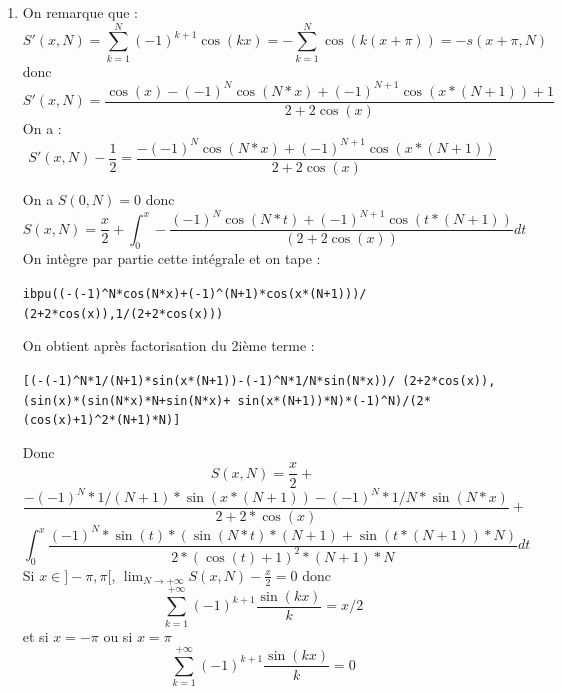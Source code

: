 \documentclass[a4paper,11pt]{book}
\begin{document}
\begin{enumerate}
{\bf Autre m\'ethode}\\
On peut aussi simplifier : $2*\sin(x/2)*s(x,N)$.\\
On tape :\\
{\tt tlin(2*sin(x/2)*cos(k*x))}\\
On obtient :\\
{\tt sin((2*k*x+x)/2)-sin((2*k*x-x)/2)}\\
Donc on a :
$$\sum_{k=1}^N\sin((2kx+x)/2)-\sin((2kx-x)/2)=\sin((2Nx+x)/2)-\sin(x/2)$$
et
$$2\sin(x/2)*s(x,N)=\sum_{k=1}^N2\sin(x/2)\cos(kx)=\sin((2Nx+x)/2)-\sin(x/2)$$
On v\'erifie et on tape:\\
{\tt tlin(2*sin(x/2)*(-sin(x/2)+sin((2*N+1)*x/2)))}\\
On obtient :\\
{\tt -1+cos(x)+cos(N*x)-cos(N*x+x)}\\
On tape:\\
{\tt trigsin(trigexpand(2*cos(2*(x/2))-2))}\\
On obtient :\\
{\tt -4*sin(x/2)\verb|^|2}\\
On tape:\\
{\tt tlin((2*cos((N+1)*x/2)*sin(N*x/2)))}\\
On obtient :\\
{\tt sin((2*N*x+x)/2)-sin(x/2)}\\
Donc on peut \'ecrire $s(x,N)$ de 4 mani\`eres :
$$s(x,N)=\sum_{k=1}^N\cos(kx)=\frac{\sin((2N+1)x/2)-\sin(x/2)}{2\sin(x/2)}=$$
$$\frac{2\cos((N+1)x/2)\sin(Nx/2))}{2\sin(x/2)}=\frac{-1+cos(x)+cos(Nx)-cos((N+1)x)}{-4\sin^2(x/2)}=$$
$$\frac{1-cos(x)-cos(Nx)+cos((N+1)x)}{2*cos(x)-2)}$$
\item On remarque que :
$$S'(x,N)=\sum_{k=1}^N(-1)^{k+1}\cos(kx)=-\sum_{k=1}^N\cos(k(x+\pi))=-s(x+\pi,N)$$ 
donc
$$S'(x,N)=\frac{\cos(x)-(-1)^N\cos(N*x)+(-1)^{N+1}\cos(x*(N+1))+1}{2+2\cos(x)}$$
On a :
$$S'(x,N)-\frac{1}{2}=\frac{-(-1)^N\cos(N*x)+(-1)^{N+1}\cos(x*(N+1))}{2+2\cos(x)}$$

On a $S(0,N)=0$ donc 
$$S(x,N)=\frac{x}{2}+\int_0^x-\frac{(-1)^N\cos(N*t)+(-1)^{N+1}\cos(t*(N+1))}{(2+2\cos(x))}dt$$
On int\`egre par partie cette int\'egrale et on tape :
\begin{center}{\tt ibpu((-(-1)\verb|^|N*cos(N*x)+(-1)\verb|^|(N+1)*cos(x*(N+1)))/ (2+2*cos(x)),1/(2+2*cos(x)))}\end{center}
On obtient apr\`es factorisation du 2i\`eme terme :
\begin{center}{\tt [(-(-1)\verb|^|N*1/(N+1)*sin(x*(N+1))-(-1)\verb|^|N*1/N*sin(N*x))/ (2+2*cos(x)),(sin(x)*(sin(N*x)*N+sin(N*x)+ sin(x*(N+1))*N)*(-1)\verb|^|N)/(2*(cos(x)+1)\verb|^|2*(N+1)*N)]}\end{center}
Donc 
$$S(x,N)=\frac{x}{2}+$$
$$\frac{-(-1)^N*1/(N+1)*\sin(x*(N+1))-(-1)^N*1/N*\sin(N*x)}{2+2*\cos(x)}+$$
$$\int_0^x\frac{(-1)^N*\sin(t)*(\sin(N*t)*(N+1)+\sin(t*(N+1))*N)}{2*(\cos(t)+1)^2*(N+1)*N}dt$$
Si $x\in]-\pi,\pi[$, $\displaystyle \lim_{N\rightarrow +\infty}{S(x,N)-\frac{x}{2}}=0$ donc
$$\sum_{k=1}^{+\infty}(-1)^{k+1}\frac{\sin(kx)}{k}=x/2$$
et si $x=-\pi$ ou si $x=\pi$
$$\sum_{k=1}^{+\infty}(-1)^{k+1}\frac{\sin(kx)}{k}=0$$
\end{enumerate}
\end{document}
